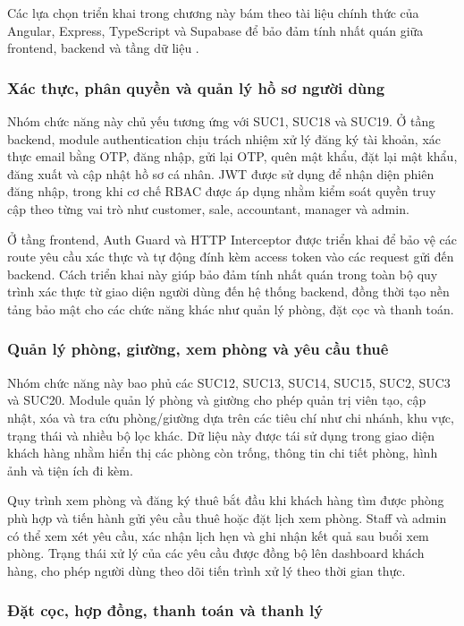 Các lựa chọn triển khai trong chương này bám theo tài liệu chính thức của Angular,
Express, TypeScript và Supabase để bảo đảm tính nhất quán giữa frontend, backend
và tầng dữ liệu \cite{angular_docs,express_docs,typescript_docs,supabase_docs}.

\subsubsection{Xác thực, phân quyền và quản lý hồ sơ người dùng}

Nhóm chức năng này chủ yếu tương ứng với SUC1, SUC18 và SUC19. Ở tầng backend, module authentication chịu trách nhiệm xử lý đăng ký tài khoản, xác thực email bằng OTP, đăng nhập, gửi lại OTP, quên mật khẩu, đặt lại mật khẩu, đăng xuất và cập nhật hồ sơ cá nhân. JWT được sử dụng để nhận diện phiên đăng nhập, trong khi cơ chế RBAC được áp dụng nhằm kiểm soát quyền truy cập theo từng vai trò như customer, sale, accountant, manager và admin.

Ở tầng frontend, Auth Guard và HTTP Interceptor được triển khai để bảo vệ các route yêu cầu xác thực và tự động đính kèm access token vào các request gửi đến backend. Cách triển khai này giúp bảo đảm tính nhất quán trong toàn bộ quy trình xác thực từ giao diện người dùng đến hệ thống backend, đồng thời tạo nền tảng bảo mật cho các chức năng khác như quản lý phòng, đặt cọc và thanh toán.

\subsubsection{Quản lý phòng, giường, xem phòng và yêu cầu thuê}

Nhóm chức năng này bao phủ các SUC12, SUC13, SUC14, SUC15, SUC2, SUC3 và SUC20. Module quản lý phòng và giường cho phép quản trị viên tạo, cập nhật, xóa và tra cứu phòng/giường dựa trên các tiêu chí như chi nhánh, khu vực, trạng thái và nhiều bộ lọc khác. Dữ liệu này được tái sử dụng trong giao diện khách hàng nhằm hiển thị các phòng còn trống, thông tin chi tiết phòng, hình ảnh và tiện ích đi kèm.

Quy trình xem phòng và đăng ký thuê bắt đầu khi khách hàng tìm được phòng phù hợp và tiến hành gửi yêu cầu thuê hoặc đặt lịch xem phòng. Staff và admin có thể xem xét yêu cầu, xác nhận lịch hẹn và ghi nhận kết quả sau buổi xem phòng. Trạng thái xử lý của các yêu cầu được đồng bộ lên dashboard khách hàng, cho phép người dùng theo dõi tiến trình xử lý theo thời gian thực.

\subsubsection{Đặt cọc, hợp đồng, thanh toán và thanh lý}

